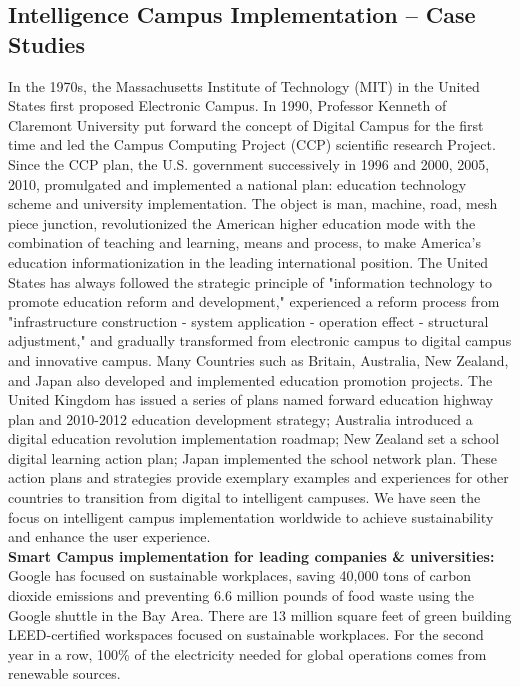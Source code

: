 \documentclass[conference]{IEEEtran}
\begin{document}
\subsection{Intelligence Campus Implementation – Case Studies}
In the 1970s, the Massachusetts Institute of Technology (MIT) in the United States first proposed Electronic Campus. In 1990, Professor Kenneth of Claremont University put forward the concept of Digital Campus for the first time and led the Campus Computing Project (CCP) scientific research Project. Since the CCP plan, the U.S. government successively in 1996 and 2000, 2005, 2010, promulgated and implemented a national plan: education technology scheme and university implementation. The object is man, machine, road, mesh piece junction, revolutionized the American higher education mode with the combination of teaching and learning, means and process, to make America's education informationization in the leading international position. The United States has always followed the strategic principle of "information technology to promote education reform and development," experienced a reform process from "infrastructure construction - system application - operation effect - structural adjustment," and gradually transformed from electronic campus to digital campus and innovative campus. Many Countries such as Britain, Australia, New Zealand, and Japan also developed and implemented education promotion projects. The United Kingdom has issued a series of plans named forward education highway plan and 2010-2012 education development strategy; Australia introduced a digital education revolution implementation roadmap; New Zealand set a school digital learning action plan; Japan implemented the school network plan. These action plans and strategies provide exemplary examples and experiences for other countries to transition from digital to intelligent campuses. We have seen the focus on intelligent campus implementation worldwide to achieve sustainability and enhance the user experience. \\

\textbf{Smart Campus implementation for leading companies & universities:} \\

Google \cite{INTCAMPUS:GoogleReport} has focused on sustainable workplaces, saving 40,000 tons of carbon dioxide emissions and preventing 6.6 million pounds of food waste using the Google shuttle in the Bay Area. There are 13 million square feet of green building LEED-certified workspaces focused on sustainable workplaces. For the second year in a row, 100\% of the electricity needed for global operations comes from renewable sources. \\
\end{document}
